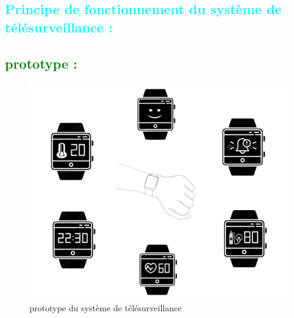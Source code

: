 \begin{flushleft}
	\section{\textcolor{cyan}{Principe de fonctionnement du système de télésurveillance : }}
	\subsection{\textcolor{green}{prototype :}}

	\begin{figure}[h]
		\centering
		\includegraphics{chapitres/images/System-removebg-preview.png}
		\caption{prototype du système de télésurveillance}
		\label{fig:labelname}
	\end{figure}

\end{flushleft}
